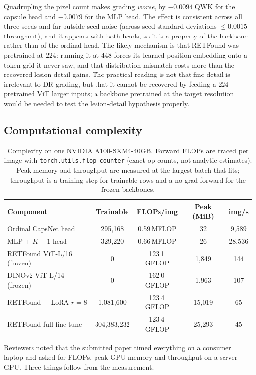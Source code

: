 \documentclass[journal]{IEEEtran}
\begin{document}
Quadrupling the pixel count makes grading \emph{worse}, by $-0.0094$ QWK for the capsule head and $-0.0079$ for the MLP head. The effect is consistent across all three seeds and far outside seed noise (across-seed standard deviations $\leq 0.0015$ throughout), and it appears with both heads, so it is a property of the backbone rather than of the ordinal head. The likely mechanism is that RETFound was pretrained at $224$: running it at $448$ forces its learned position embedding onto a token grid it never saw, and that distribution mismatch costs more than the recovered lesion detail gains. The practical reading is not that fine detail is irrelevant to DR grading, but that it cannot be recovered by feeding a $224$-pretrained ViT larger inputs; a backbone pretrained at the target resolution would be needed to test the lesion-detail hypothesis properly.




\subsection{Computational complexity}
\label{sec:compute}
\begin{table}[!t]
\centering
\caption{Complexity on one NVIDIA A100-SXM4-40GB. Forward FLOPs are traced per image with \texttt{torch.utils.flop\_counter} (exact op counts, not analytic estimates). Peak memory and throughput are measured at the largest batch that fits; throughput is a training step for trainable rows and a no-grad forward for the frozen backbones.}
\label{tab:compute}
\begin{tabular}{lcccc}
\toprule
Component & Trainable & FLOPs/img & Peak (MiB) & img/s \\
\midrule
Ordinal CapsNet head & 295{,}168 & 0.59\,MFLOP & 32 & 9{,}589 \\
MLP + $K{-}1$ head & 329{,}220 & 0.66\,MFLOP & 26 & 28{,}536 \\
RETFound ViT-L/16 (frozen) & 0 & 123.1\,GFLOP & 1{,}849 & 144 \\
DINOv2 ViT-L/14 (frozen) & 0 & 162.0\,GFLOP & 1{,}963 & 107 \\
RETFound $+$ LoRA $r{=}8$ & 1{,}081{,}600 & 123.4\,GFLOP & 15{,}019 & 65 \\
RETFound full fine-tune & 304{,}383{,}232 & 123.4\,GFLOP & 25{,}293 & 45 \\
\bottomrule
\end{tabular}
\end{table}

Reviewers noted that the submitted paper timed everything on a consumer laptop and asked for FLOPs, peak GPU memory and throughput on a server GPU. Three things follow from the measurement.
\end{document}
